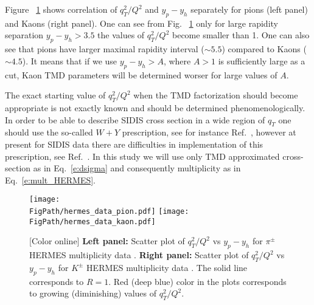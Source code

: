 \documentclass[final,3p,times,onecolumn,sort&compress,hidelinks]{elsarticle}
\newcommand\3[1]{\boldsymbol{#1}}
\newcommand*{\FigPath}{../Figs/}%
\begin{document}
Figure ~\ref{Fig:hermes_data_R} shows correlation of $q_T^2/Q^2$ and $y_p-y_h$ separately for pions (left panel) and Kaons (right panel).
One can see from Fig. ~\ref{Fig:hermes_data_R} only for large rapidity separation $y_p-y_h > 3.5$ the values of $q_T^2/Q^2$ become smaller than 1.  One can also see that pions have larger maximal rapidity interval ($\sim 5.5$) compared to Kaons ($\sim 4.5$). It means that if we use 
$y_p-y_h>A$, where $A> 1$ is sufficiently large as a cut, Kaon TMD parameters will be determined worser for large values of $A$.

The exact starting value of $q_T^2/Q^2$ when the TMD factorization should become appropriate is not exactly known and should be determined phenomenologically. In order to be able to describe SIDIS cross section in a wide region of $q_T$ one should use the so-called $W+Y$ prescription, see for instance Ref.~\cite{Collins:2016hqq}, however at present for SIDIS data there are difficulties in implementation of this prescription, see Ref.~\cite{Gonzalez-Hernandez:2018ipj}. In this study we will use only TMD approximated cross-section as in Eq.~\eqref{e:dsigma} and consequently multiplicity as in Eq.~\eqref{e:mult_HERMES}. 


 
\begin{figure}[htb!]
\centering
\texttt{[image: \\FigPath/hermes\_data\_pion.pdf]}
\texttt{[image: \\FigPath/hermes\_data\_kaon.pdf]}
\caption{\label{Fig:hermes_data_R}
[Color online] {\bf Left panel:} Scatter plot of $q_T^2/Q^2$ vs $y_p-y_h$ for $\pi^\pm$ HERMES multiplicity data . {\bf Right panel:} 
Scatter plot of $q_T^2/Q^2$ vs $y_p-y_h$ for $K^\pm$ HERMES multiplicity data . The solid line corresponds to $R=1$. Red (deep blue) color in the plots corresponds to growing (diminishing) values of $q_T^2/Q^2$.
}
\end{figure}
\end{document}
